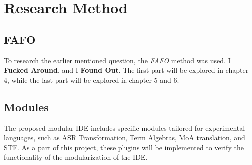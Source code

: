 \chapter{Research Method}

\section{FAFO}

To research the earlier mentioned question, the \textit{FAFO} method was used.
I \textbf{Fucked Around}, and I \textbf{Found Out}. The first part will be explored in chapter 4,
while the last part will be explored in chapter 5 and 6.

\section{Modules}

The proposed modular IDE includes specific modules tailored for experimental
languages, such as ASR Transformation, Term Algebras, MoA translation, and STF.
As a part of this project, these plugins will be implemented to verify the
functionality of the modularization of the IDE.
